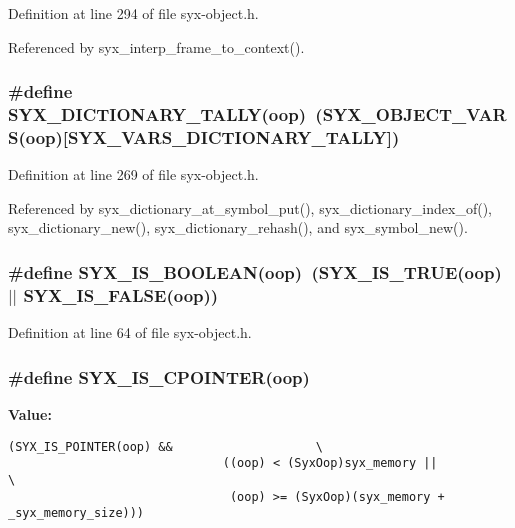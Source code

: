 Definition at line 294 of file syx-object.h.

Referenced by syx\_\-interp\_\-frame\_\-to\_\-context().\hypertarget{syx-object_8h_9a20885f5a52f4bc0b7a79eb39e8b96e}{
\subsubsection{\setlength{\rightskip}{0pt plus 5cm}\#define SYX\_\-DICTIONARY\_\-TALLY(oop)~(SYX\_\-OBJECT\_\-VARS(oop)\mbox{[}SYX\_\-VARS\_\-DICTIONARY\_\-TALLY\mbox{]})}}
\label{syx-object_8h_9a20885f5a52f4bc0b7a79eb39e8b96e}




Definition at line 269 of file syx-object.h.

Referenced by syx\_\-dictionary\_\-at\_\-symbol\_\-put(), syx\_\-dictionary\_\-index\_\-of(), syx\_\-dictionary\_\-new(), syx\_\-dictionary\_\-rehash(), and syx\_\-symbol\_\-new().\hypertarget{syx-object_8h_4748238146463f5f05f8c11ff422b6d3}{
\subsubsection{\setlength{\rightskip}{0pt plus 5cm}\#define SYX\_\-IS\_\-BOOLEAN(oop)~(SYX\_\-IS\_\-TRUE(oop) $|$$|$ SYX\_\-IS\_\-FALSE(oop))}}
\label{syx-object_8h_4748238146463f5f05f8c11ff422b6d3}




Definition at line 64 of file syx-object.h.\hypertarget{syx-object_8h_2cf93a0e501e2f8742d71709cb796fef}{
\subsubsection{\setlength{\rightskip}{0pt plus 5cm}\#define SYX\_\-IS\_\-CPOINTER(oop)}}
\label{syx-object_8h_2cf93a0e501e2f8742d71709cb796fef}


\textbf{Value:}

\begin{Code}\begin{verbatim}(SYX_IS_POINTER(oop) &&                    \
                              ((oop) < (SyxOop)syx_memory ||            \
                               (oop) >= (SyxOop)(syx_memory + _syx_memory_size)))
\end{verbatim}
\end{Code}


